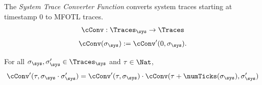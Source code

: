 \begin{definition}
    \label{def:cconv}
    The \emph{System Trace Converter Function} converts system
    traces starting at timestamp $0$ to MFOTL traces.
    \begin{equation*}
        \cConv: \Traces_\sys \to \Traces
    \end{equation*}
    \begin{align*}
        \cConv(\sigma_\sys) := \cConv'(0, \sigma_\sys).
    \end{align*}
\end{definition}

\begin{lemma}
    \label{lem:cconv'-splitting}
    For all $\sigma_\sys, \sigma_\sys' \in \Traces_\sys$
    and $\tau \in \Nat$,
    \begin{equation*}
        \cConv'(\tau, \sigma_\sys \cdot \sigma_\sys')
        = \cConv'(\tau, \sigma_\sys) \cdot
        \cConv(\tau + \numTicks(\sigma_\sys), \sigma_\sys')
    \end{equation*}
\end{lemma}

